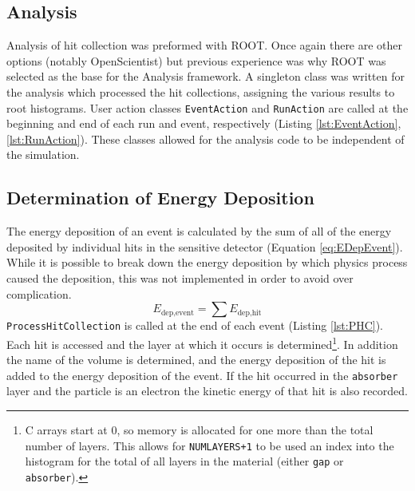 \subsection{Analysis}

Analysis of hit collection was preformed with ROOT.  Once again there are other options (notably OpenScientist) but previous experience was why ROOT was selected as the base for the Analysis framework.
A singleton class was written for the analysis which processed the hit collections, assigning the various results to root histograms.
User action classes \verb+EventAction+ and \verb+RunAction+ are called at the beginning and end of each run and event, respectively (Listing \ref{lst:EventAction},\ref{lst:RunAction}).
These classes allowed for the analysis code to be independent of the simulation.



\subsection{Determination of Energy Deposition}

The energy deposition of an event is calculated by the sum of all of the energy deposited by individual hits in the sensitive detector (Equation \ref{eq:EDepEvent}).
While it is possible to break down the energy deposition by which physics process caused the deposition, this was not implemented in order to avoid over complication.
\begin{equation}[h]
\label{eq:EDepEvent}
E_{\text{dep},\text{event}} = \sum{E_{\text{dep},\text{hit}} }
\end{equation}
\verb+ProcessHitCollection+ is called at the end of each event (Listing \ref{lst:PHC}).
Each hit is accessed and the layer at which it occurs is determined\footnote{C arrays start at 0, so memory is allocated for one more than the total number of layers. This allows for \verb|NUMLAYERS+1| to be used an index into the histogram for the total of all layers in the material (either \verb+gap+ or \verb+absorber+). }.
In addition the name of the volume is determined, and the energy deposition of the hit is added to the energy deposition of the event.
If the hit occurred in the \verb+absorber+ layer and the particle is an electron the kinetic energy of that hit is also recorded.


